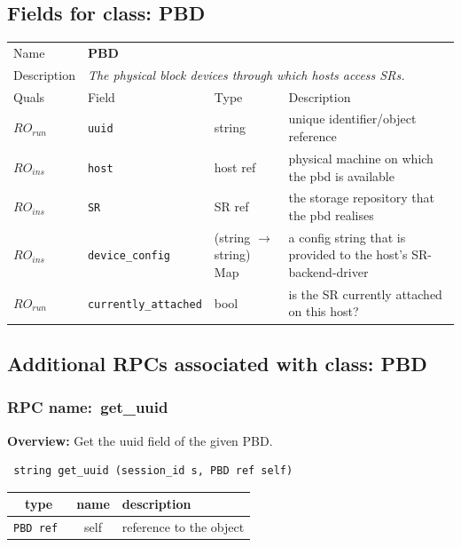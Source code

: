 \subsection{Fields for class: PBD}
\begin{longtable}{|lllp{}|}
\hline
\multicolumn{1}{|l}{Name} & \multicolumn{3}{l|}{\bf PBD} \\
\multicolumn{1}{|l}{Description} & \multicolumn{3}{l|}{\parbox{11cm}{\em
The physical block devices through which hosts access SRs.}} \\
\hline
Quals & Field & Type & Description \\
\hline
$\mathit{RO}_\mathit{run}$ &  {\tt uuid} & string & unique identifier/object reference \\
$\mathit{RO}_\mathit{ins}$ &  {\tt host} & host ref & physical machine on which the pbd is available \\
$\mathit{RO}_\mathit{ins}$ &  {\tt SR} & SR ref & the storage repository that the pbd realises \\
$\mathit{RO}_\mathit{ins}$ &  {\tt device\_config} & (string $\rightarrow$ string) Map & a config string that is provided to the host's SR-backend-driver \\
$\mathit{RO}_\mathit{run}$ &  {\tt currently\_attached} & bool & is the SR currently attached on this host? \\
\hline
\end{longtable}
\subsection{Additional RPCs associated with class: PBD}
\subsubsection{RPC name:~get\_uuid}

{\bf Overview:} 
Get the uuid field of the given PBD.

\begin{verbatim} string get_uuid (session_id s, PBD ref self)\end{verbatim}



 
\vspace{0.3cm}
\begin{tabular}{|c|c|p{7cm}|}
 \hline
{\bf type} & {\bf name} & {\bf description} \\ \hline
{\tt PBD ref } & self & reference to the object \\ \hline 

\end{tabular}

